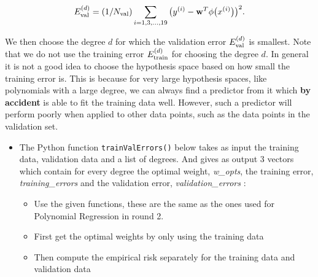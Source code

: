 \documentclass[11pt]{article}
\providecommand{\tightlist}{%
      \setlength{\itemsep}{0pt}\setlength{\parskip}{0pt}}
\begin{document}
\begin{equation}
E_{\rm val}^{(d)} = (1/N_{\rm val}) \sum_{i=1,3,\ldots,19} \big(y^{(i)} - \mathbf{w}^{T}\phi\big(x^{(i)}\big) \big)^2.
\end{equation}

We then choose the degree \(d\) for which the validation error
\(E_{\rm val}^{(d)}\) is smallest. Note that we do not use the training
error \(E_{\rm train}^{(d)}\) for choosing the degree \(d\). In general
it is not a good idea to choose the hypothesis space based on how small
the training error is. This is because for very large hypothesis spaces,
like polynomials with a large degree, we can always find a predictor
from it which \textbf{by accident} is able to fit the training data
well. However, such a predictor will perform poorly when applied to
other data points, such as the data points in the validation set.

\begin{itemize}
\tightlist
\item
  The Python function \texttt{trainValErrors()} below takes as input the
  training data, validation data and a list of degrees. And gives as
  output 3 vectors which contain for every degree the optimal weight,
  \emph{w\_opts}, the training error, \emph{training\_errors} and the
  validation error, \emph{validation\_errors} :

  \begin{itemize}
  \tightlist
  \item
    Use the given functions, these are the same as the ones used for
    Polynomial Regression in round 2.
  \item
    First get the optimal weights by only using the training data
  \item
    Then compute the empirical risk separately for the training data and
    validation data
  \end{itemize}
\end{itemize}
\end{document}
